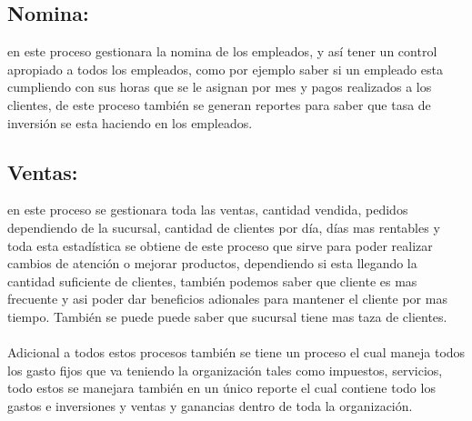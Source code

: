 \subsection{Nomina:}en este proceso gestionara la nomina de los empleados, y as\'i tener un control apropiado a todos los empleados, como por ejemplo saber si un empleado esta cumpliendo con sus horas que se le asignan por mes y pagos realizados a los clientes, de este proceso tambi\'en se generan reportes para saber que tasa de inversi\'on se esta haciendo en los empleados.
\subsection{Ventas:}en este proceso se gestionara toda las ventas, cantidad vendida, pedidos dependiendo de la sucursal, cantidad de clientes por d\'ia, d\'ias mas rentables y toda esta estad\'istica se obtiene de este proceso que sirve para poder realizar cambios de atenci\'on o mejorar productos, dependiendo si esta llegando la cantidad suficiente de clientes, tambi\'en podemos saber que cliente es mas frecuente y asi poder dar beneficios adionales para mantener el cliente por mas tiempo. Tambi\'en se puede puede saber que sucursal tiene mas taza de clientes.
\\%
\\%
Adicional a todos estos procesos tambi\'en se tiene un proceso el cual maneja todos los gasto fijos que va teniendo la organizaci\'on tales como impuestos, servicios, todo estos se manejara tambi\'en en un \'unico reporte el cual contiene todo los gastos e inversiones y  ventas y ganancias dentro de toda la organizaci\'on.
\\%
\\%

